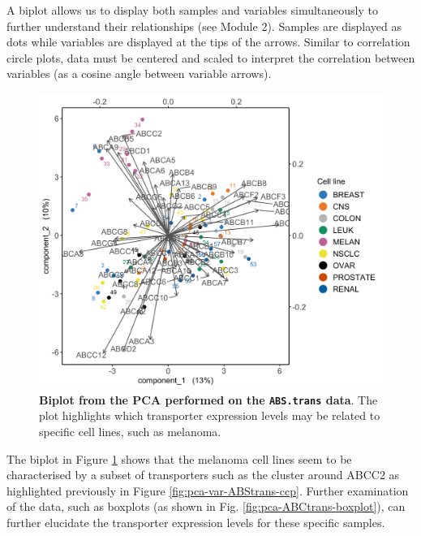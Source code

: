 \documentclass[]{book}
\newenvironment{Shaded}{\begin{snugshade}}{\end{snugshade}}
\newcommand{\KeywordTok}[1]{\textcolor[rgb]{0.13,0.29,0.53}{\textbf{#1}}}
\newcommand{\DataTypeTok}[1]{\textcolor[rgb]{0.13,0.29,0.53}{#1}}
\newcommand{\StringTok}[1]{\textcolor[rgb]{0.31,0.60,0.02}{#1}}
\newcommand{\OperatorTok}[1]{\textcolor[rgb]{0.81,0.36,0.00}{\textbf{#1}}}
\newcommand{\NormalTok}[1]{#1}
\begin{document}
A biplot allows us to display both samples and variables simultaneously
to further understand their relationships (see Module 2). Samples are
displayed as dots while variables are displayed at the tips of the
arrows. Similar to correlation circle plots, data must be centered and
scaled to interpret the correlation between variables (as a cosine angle
between variable arrows).

\begin{Shaded}
\end{Shaded}

\begin{figure}

{\centering \includegraphics[width=0.5\linewidth]{Figures/PCA/pca-ABStrans-biplot-1} 

}

\caption{\textbf{Biplot from the PCA performed on the
\texttt{ABS.trans} data}. The plot highlights which transporter
expression levels may be related to specific cell lines, such as
melanoma.}\label{fig:pca-ABStrans-biplot}
\end{figure}






The biplot in Figure \ref{fig:pca-ABStrans-biplot} shows that the
melanoma cell lines seem to be characterised by a subset of transporters
such as the cluster around ABCC2 as highlighted previously in Figure
\ref{fig:pca-var-ABStrans-ccp}. Further examination of the data, such as
boxplots (as shown in Fig. \ref{fig:pca-ABCtrans-boxplot}), can further
elucidate the transporter expression levels for these specific samples.
\end{document}

